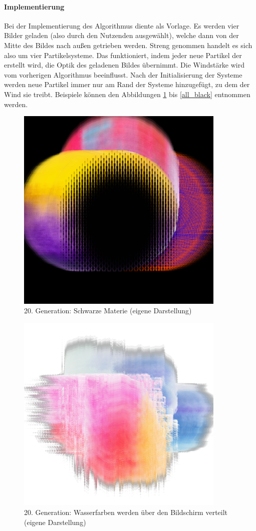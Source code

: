 \documentclass[../mciAusarbeitung.tex]{subfiles}
\begin{document}
\paragraph{Implementierung}
Bei der Implementierung des Algorithmus diente \cite{shiffman2022smoke} als Vorlage. Es werden vier Bilder geladen (also durch den Nutzenden ausgewählt), welche dann von der Mitte des Bildes nach außen getrieben werden. Streng genommen handelt es sich also um vier Partikelsysteme. Das funktioniert, indem jeder neue Partikel der erstellt wird, die Optik des geladenen Bildes übernimmt. Die Windstärke wird vom vorherigen Algorithmus beeinflusst. Nach der Initialisierung der Systeme werden neue Partikel immer nur am Rand der Systeme hinzugefügt, zu dem der Wind sie treibt.
Beispiele können den Abbildungen \ref{black_materia_gen20} bis \ref{all_black} entnommen werden.

\begin{figure}[H]
\includegraphics[width=10cm]{img/black_materia_gen20.png}
\caption{20. Generation: Schwarze Materie (eigene Darstellung)}
\label{black_materia_gen20}
\end{figure}

\begin{figure}[H]
\includegraphics[width=10cm]{img/watercolor_gen20.png}
\caption{20. Generation: Wasserfarben werden über den Bildschirm verteilt (eigene Darstellung)}
\label{watercolor_gen20}
\end{figure}
\end{document}
